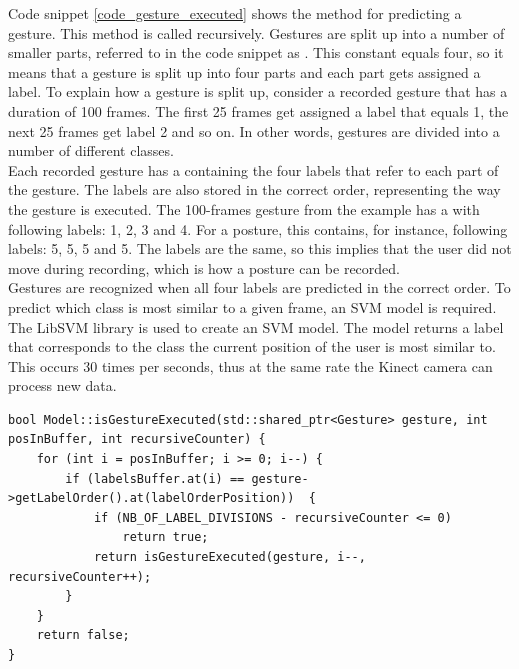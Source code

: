 Code snippet \ref{code_gesture_executed} shows the method for predicting a gesture. This method is called recursively. Gestures are split up into a number of smaller parts, referred to in the code snippet as . This constant equals four, so it means that a gesture is split up into four parts and each part gets assigned a label. To explain how a gesture is split up, consider a recorded gesture that has a duration of 100 frames. The first 25 frames get assigned a label that equals 1, the next 25 frames get label 2 and so on. In other words, gestures are divided into a number of different classes.\\

Each recorded gesture has a  containing the four labels that refer to each part of the gesture. The labels are also stored in the correct order, representing the way the gesture is executed. The 100-frames gesture from the example has a  with following labels: 1, 2, 3 and 4. For a posture, this  contains, for instance, following labels: 5, 5, 5 and 5. The labels are the same, so this implies that the user did not move during recording, which is how a posture can be recorded.\\

Gestures are recognized when all four labels are predicted in the correct order. To predict which class is most similar to a given frame, an SVM model is required. The LibSVM library \cite{LibSVM} is used to create an SVM model. The model returns a label that corresponds to the class the current position of the user is most similar to. This occurs 30 times per seconds, thus at the same rate the Kinect camera can process new data.\\

\begin{lstlisting}[caption=method to verify if a gesture with given label is executed, label=code_gesture_executed]
bool Model::isGestureExecuted(std::shared_ptr<Gesture> gesture, int posInBuffer, int recursiveCounter) {
	for (int i = posInBuffer; i >= 0; i--) {
		if (labelsBuffer.at(i) == gesture->getLabelOrder().at(labelOrderPosition))	{
			if (NB_OF_LABEL_DIVISIONS - recursiveCounter <= 0)
				return true;
			return isGestureExecuted(gesture, i--, recursiveCounter++);
		}
	}
	return false;
}
\end{lstlisting}